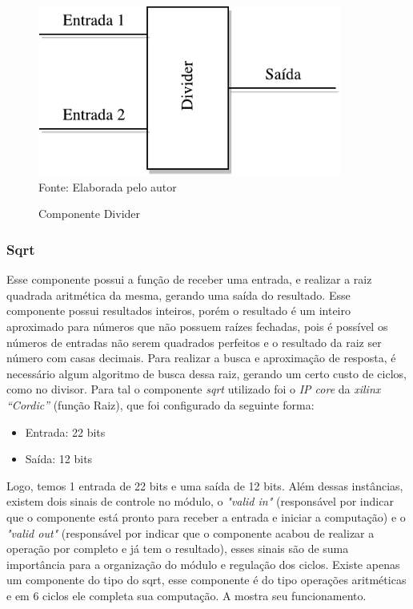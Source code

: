 \begin{figure}[H]
	\centering
	\caption{Componente Divider}
	\includegraphics[width=10cm]{figures/Divider.pdf}\\
	
	{Fonte: Elaborada pelo autor}
	\label{divider}
\end{figure}

\subsubsection{Sqrt}
Esse componente possui a função de receber uma entrada, e realizar a raiz quadrada aritmética da mesma, gerando uma saída do resultado. Esse componente possui resultados inteiros, porém o resultado é um inteiro aproximado para números que não possuem raízes fechadas, pois é possível os números de entradas não serem quadrados perfeitos e o resultado da raiz ser número com casas decimais. Para realizar a busca e aproximação de resposta, é necessário algum algoritmo de busca dessa raiz, gerando um certo custo de ciclos, como no divisor. Para tal o componente \textit{sqrt} utilizado foi o \textit{IP core} da \textit{xilinx “Cordic”} (função Raiz), que foi configurado da seguinte forma: 
\begin{itemize}
	\item Entrada: 22 bits
	\item Saída: 12 bits
\end{itemize}
Logo, temos 1 entrada de 22 bits e uma saída de 12 bits. Além dessas instâncias, existem dois sinais de controle no módulo, o \textit{"valid in"} (responsável por indicar que o componente está pronto para receber a entrada e iniciar a computação) e o \textit{"valid out"} (responsável por indicar que o componente acabou de realizar a operação por completo e já tem o resultado), esses sinais são de suma importância para a organização do módulo e regulação dos ciclos. Existe apenas um componente do tipo do sqrt, esse componente é do tipo operações aritméticas e em 6 ciclos ele completa sua computação. A  mostra seu funcionamento.

